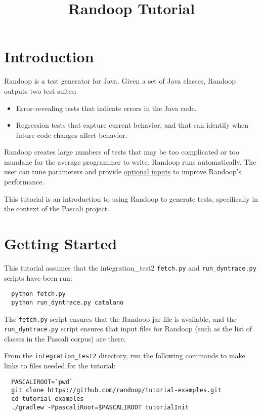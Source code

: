 \documentclass[11pt, oneside]{article} %
\title{Randoop Tutorial}
\newcommand{\cmd}[1]{{\texttt{#1}}}
\begin{document}
\maketitle

\section{Introduction}
Randoop is a test generator for Java.
Given a set of Java classes, Randoop outputs two test suites:
\begin{itemize}
\item Error-revealing tests that indicate errors in the Java code.
\item Regression tests that capture current behavior, and that can identify
  when future code changes affect behavior.
\end{itemize}
Randoop creates large numbers of tests that may be too complicated or too
mundane for the average programmer to write.
Randoop runs automatically.  The user can tune parameters and provide
\href{https://randoop.github.io/randoop/manual/#command-line-options}{optional inputs} to improve Randoop's performance.

This tutorial is an introduction to using Randoop to generate tests, specifically in the context of the Pascali project.

\section{Getting Started}
This tutorial assumes that the integration\_test2 \cmd{fetch.py} and \cmd{run\_dyntrace.py}
scripts have been run:
\begin{verbatim}
  python fetch.py
  python run_dyntrace.py catalano
\end{verbatim}
The \cmd{fetch.py} script ensures that the Randoop jar file is available,
and the \cmd{run\_dyntrace.py} script ensures that input files for Randoop (such as
the list of classes in the Pascali corpus) are there.

From the \texttt{integration\_test2} directory, run the
following commands to make links to files needed for the tutorial:
\begin{verbatim}
  PASCALIROOT=`pwd`
  git clone https://github.com/randoop/tutorial-examples.git
  cd tutorial-examples
  ./gradlew -PpascaliRoot=$PASCALIROOT tutorialInit 
\end{verbatim}
\end{document}
